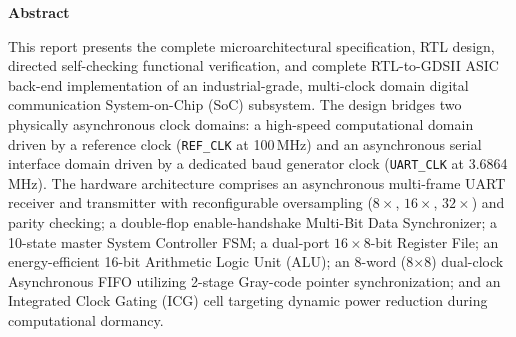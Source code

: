 \documentclass[11pt,a4paper]{article}
\begin{document}
\newpage

\begin{center}
    {\large \textbf{Abstract}}
\end{center}

\noindent
This report presents the complete microarchitectural specification, RTL design, directed self-checking functional verification, and complete RTL-to-GDSII ASIC back-end implementation of an industrial-grade, multi-clock domain digital communication System-on-Chip (SoC) subsystem. The design bridges two physically asynchronous clock domains: a high-speed computational domain driven by a reference clock (\texttt{REF\_CLK} at 100\,MHz) and an asynchronous serial interface domain driven by a dedicated baud generator clock (\texttt{UART\_CLK} at 3.6864\,MHz). The hardware architecture comprises an asynchronous multi-frame UART receiver and transmitter with reconfigurable oversampling ($8\times$, $16\times$, $32\times$) and parity checking; a double-flop enable-handshake Multi-Bit Data Synchronizer; a 10-state master System Controller FSM; a dual-port $16\times 8$-bit Register File; an energy-efficient 16-bit Arithmetic Logic Unit (ALU); an 8-word (8$\times$8) dual-clock Asynchronous FIFO utilizing 2-stage Gray-code pointer synchronization; and an Integrated Clock Gating (ICG) cell targeting dynamic power reduction during computational dormancy.
\end{document}
